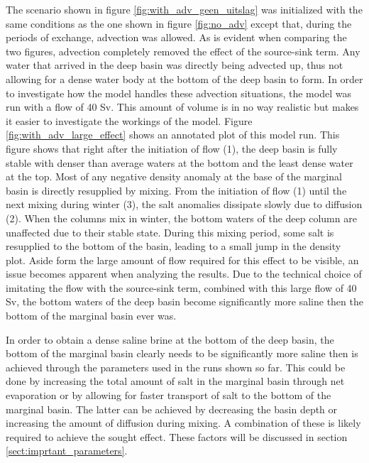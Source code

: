 \documentclass[twocolumn]{article}
\begin{document}
The scenario shown in figure \ref{fig:with_adv_geen_uitslag} was initialized with the same conditions as the one shown in figure \ref{fig:no_adv} except that, during the periods of exchange, advection was allowed. As is evident when comparing the two figures, advection completely removed the effect of the source-sink term. Any water that arrived in the deep basin was directly being advected up, thus not allowing for a dense water body at the bottom of the deep basin to form. In order to investigate how the model handles these advection situations, the model was run with a flow of 40 Sv. This amount of volume is in no way realistic but makes it easier to investigate the workings of the model. Figure \ref{fig:with_adv_large_effect} shows an annotated plot of this model run. This figure shows that right after the initiation of flow (1), the deep basin is fully stable with denser than average waters at the bottom and the least dense water at the top. Most of any negative density anomaly at the base of the marginal basin is directly resupplied by mixing. From the initiation of flow (1) until the next mixing during winter (3), the salt anomalies dissipate slowly due to diffusion (2). When the columns mix in winter, the bottom waters of the deep column are unaffected due to their stable state. During this mixing period, some salt is resupplied to the bottom of the basin, leading to a small jump in the density plot. 
Aside form the large amount of flow required for this effect to be visible, an issue becomes apparent when analyzing the results. Due to the technical choice of imitating the flow with the source-sink term, combined with this large flow of 40 Sv, the bottom waters of the deep basin become significantly more saline then the bottom of the marginal basin ever was. 

In order to obtain a dense saline brine at the bottom of the deep basin, the bottom of the marginal basin clearly needs to be significantly more saline then is achieved through the parameters used in the runs shown so far. This could be done by increasing the total amount of salt in the marginal basin through net evaporation or by allowing for faster transport of salt to the bottom of the marginal basin. The latter can be achieved by decreasing the basin depth or increasing the amount of diffusion during mixing. A combination of these is likely required to achieve the sought effect. These factors will be discussed in section \ref{sect:imprtant_parameters}.
\end{document}
